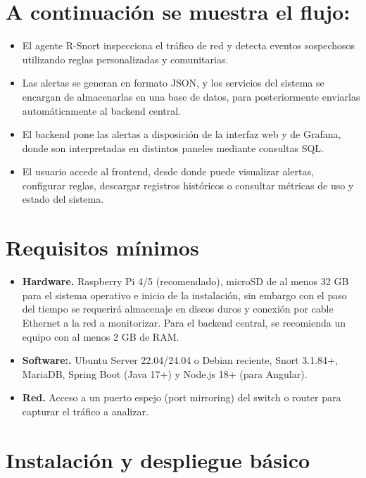 \documentclass[11pt,a4paper,twoside]{report}
\begin{document}
\section{A continuación se muestra el flujo:}

\begin{itemize}
	\item El agente R-Snort inspecciona el tráfico de red y detecta eventos sospechosos utilizando reglas personalizadas y comunitarias.
	
	\item Las alertas se generan en formato JSON, y los servicios del sistema se encargan de almacenarlas en una base de datos, para posteriormente enviarlas automáticamente al backend central.
	
	\item El backend pone las alertas a disposición de la interfaz web y de Grafana, donde son interpretadas en distintos paneles mediante consultas SQL.
	
	\item El usuario accede al frontend, desde donde puede visualizar alertas, configurar reglas, descargar registros históricos o consultar métricas de uso y estado del sistema.
\end{itemize}


\section{Requisitos mínimos}

\begin{itemize}
	\item \textbf{Hardware.} Raspberry Pi 4/5 (recomendado), microSD de al menos 32 GB para el sistema operativo e inicio de la instalación, sin embargo con el paso del tiempo se requerirá almacenaje en discos duros y conexión por cable Ethernet a la red a monitorizar. Para el backend central, se recomienda un equipo con al menos 2 GB de RAM.
	\item \textbf{Software:.} Ubuntu Server 22.04/24.04 o Debian reciente, Snort 3.1.84+, MariaDB, Spring Boot (Java 17+) y Node.js 18+ (para Angular).
	\item \textbf{Red.} Acceso a un puerto espejo (port mirroring) del switch o router para capturar el tráfico a analizar.
\end{itemize}

\section{Instalación y despliegue básico}
\end{document}
